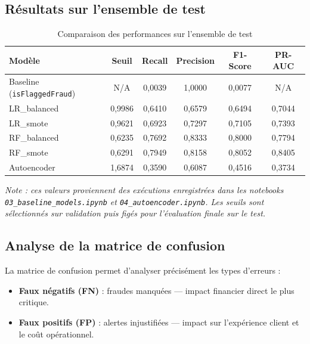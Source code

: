\documentclass[12pt,a4paper,twoside]{report}
\begin{document}
\subsection{Résultats sur l'ensemble de test}

\begin{table}[H]
\centering
\caption{Comparaison des performances sur l'ensemble de test}
\label{tab:results_comparison}
\begin{tabular}{lccccc}
\toprule
\textbf{Modèle} & \textbf{Seuil} & \textbf{Recall} & \textbf{Precision} & \textbf{F1-Score} & \textbf{PR-AUC} \\
\midrule
Baseline (\texttt{isFlaggedFraud}) & N/A   & 0,0039 & 1,0000 & 0,0077 & N/A \\
LR\_balanced                       & 0,9986 & 0,6410 & 0,6579 & 0,6494 & 0,7044 \\
LR\_smote                          & 0,9621 & 0,6923 & 0,7297 & 0,7105 & 0,7393 \\
RF\_balanced                       & 0,6235 & 0,7692 & 0,8333 & 0,8000 & 0,7794 \\
RF\_smote                          & 0,6291 & 0,7949 & 0,8158 & 0,8052 & 0,8405 \\
Autoencoder                        & 1,6874 & 0,3590 & 0,6087 & 0,4516 & 0,3734 \\
\bottomrule
\end{tabular}
\end{table}

\textit{Note : ces valeurs proviennent des exécutions enregistrées dans les notebooks \texttt{03\_baseline\_models.ipynb} et \texttt{04\_autoencoder.ipynb}. Les seuils sont sélectionnés sur validation puis figés pour l'évaluation finale sur le test.}

\subsection{Analyse de la matrice de confusion}

La matrice de confusion permet d'analyser précisément les types d'erreurs :

\begin{itemize}
  \item \textbf{Faux négatifs (FN)} : fraudes manquées --- impact financier direct le plus critique.
  \item \textbf{Faux positifs (FP)} : alertes injustifiées --- impact sur l'expérience client et le coût opérationnel.
\end{itemize}
\end{document}
